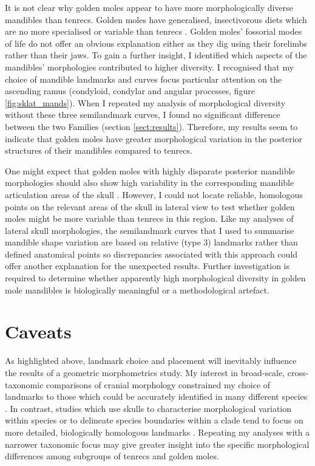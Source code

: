 	It is not clear why golden moles appear to have more morphologically diverse mandibles than tenrecs. Golden moles have generalised, insectivorous diets \citep{Bronner1995} which are no more specialised or variable than tenrecs \citep{Soarimalala2011}. Golden moles' fossorial modes of life do not offer an obvious explanation either as they dig using their forelimbs rather than their jaws.
	To gain a further insight, I identified which aspects of the mandibles' morphologies contributed to higher diversity. I recognised that 
	my choice of mandible landmarks and curves focus particular attention on the ascending ramus (condyloid, condylar and angular processes, figure \ref{fig:sklat_mands}). When I repeated my analysis of morphological diversity without these three semilandmark curves, I found no significant difference between the two Families (section \ref{sect:results}). Therefore, my results seem to indicate that golden moles have greater morphological variation in the posterior structures of their mandibles compared to tenrecs. 
	
	One might expect that golden moles with highly disparate posterior mandible morphologies should also show high variability in the corresponding mandible articulation areas of the skull \citep[although developmental genetics studies have revealed that mandibles can also develop shape variation independently of skulls, ][] {Rot-Nikcevic2007}. However, I could not locate reliable, homologous points on the relevant areas of the skull in lateral view to test whether golden moles might be more variable than tenrecs in this region. Like my analyses of lateral skull morphologies, the semilandmark curves that I used to summarise mandible shape variation are based on relative (type 3) landmarks rather than defined anatomical points \citep{Zelditch2012} so discrepancies associated with this approach could offer another explanation for the unexpected results. Further investigation is required to determine whether apparently high morphological diversity in golden mole mandibles is biologically meaningful or a methodological artefact. 

		
\section{Caveats}
\label{sect:caveats}

	As highlighted above, landmark choice and placement will inevitably influence the results of a geometric morphometrics study. My interest in broad-scale, cross-taxonomic comparisons of cranial morphology constrained my choice of landmarks to those which could be accurately identified in many different species \citep[e.g.][]{Ruta2013, Goswami2011, Wroe2007}. In contrast, studies which use skulls to characterise morphological variation within species \citep{Blagojevic2011, Bornholdt2008} or to delineate species boundaries within a clade \citep[e.g.][]{Panchetti2008} tend to focus on more detailed, biologically homologous landmarks \citep{Zelditch2012}. Repeating my analyses with a narrower taxonomic focus may give greater insight into the specific morphological differences among subgroups of tenrecs and golden moles.
	
